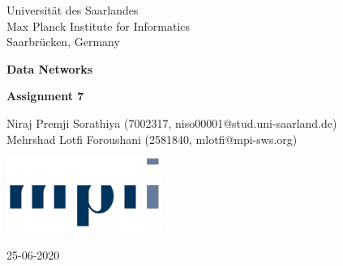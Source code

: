 \documentclass[fleqn]{article}
\begin{document}
\begin{titlepage}
	\clearpage\thispagestyle{empty}
	\centering
	\vspace{1cm}

	{\normalsize Universität des Saarlandes \\ 
		Max Planck Institute for Informatics \\
		Saarbrücken, Germany \par}
		\vspace{3cm}
	{\Huge \textbf{Data Networks}} \\
	\vspace{1cm}
	{\large \textbf{Assignment 7} \par}
	\vspace{4cm}
	{\normalsize Niraj Premji Sorathiya (7002317, niso00001@stud.uni-saarland.de)   \\ %
	             Mehrshad Lotfi Foroushani (2581840, mlotfi@mpi-sws.org)\par}
	\vspace{5cm}
    
    \centering \includegraphics[scale=0.6]{logo.png}
    
    \vspace{0.5cm}
		
	{\normalsize 25-06-2020 \par}
	
	\pagebreak

\end{titlepage}


    
    
    
    
\end{document}
